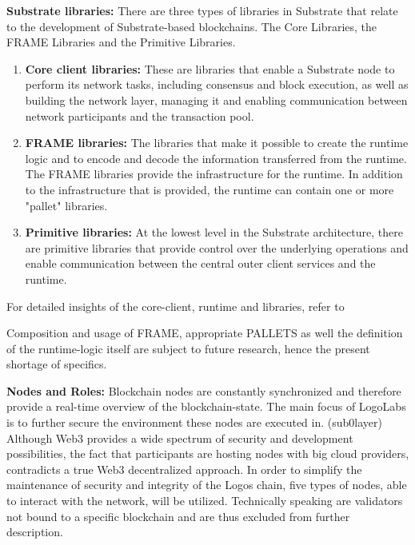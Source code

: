 \documentclass[]{article}
\begin{document}
\textbf{Substrate libraries:}
There are three types of libraries in Substrate that relate to the development of Substrate-based blockchains.
The Core Libraries, the FRAME Libraries and the Primitive Libraries.  

\begin{enumerate}[label=\textbullet]
	\item\textbf{Core client libraries:}
    These are libraries that enable a Substrate node to perform its network tasks, including consensus and block execution, as well as building the network layer, managing it and enabling communication between network participants and the transaction pool. 
	
	\item\textbf{FRAME libraries:} 
    The libraries that make it possible to create the runtime logic and to encode and decode the information transferred from the runtime.
    The FRAME libraries provide the infrastructure for the runtime.
    In addition to the infrastructure that is provided, the runtime can contain one or more "pallet" libraries.    
	
	\item\textbf{Primitive libraries:} 
	At the lowest level in the Substrate architecture, there are primitive libraries that provide control over the underlying operations and enable communication between the central outer client services and the runtime.	
\end{enumerate}
For detailed insights of the core-client, runtime and libraries, refer to \cite{SubstrateDoc-arch}

Composition and usage of FRAME, appropriate PALLETS as well the definition of the runtime-logic itself are subject to future research, hence the present shortage of specifics.
\newline

\textbf{Nodes and Roles:}
Blockchain nodes are constantly synchronized and therefore provide a real-time overview of the blockchain-state.
The main focus of LogoLabs is to further secure the environment these nodes are executed in. (sub0layer)
Although Web3 provides a wide spectrum of security and development possibilities, the fact that participants are hosting nodes with big cloud providers, contradicts a true Web3 decentralized approach. 
In order to simplify the maintenance of security and integrity of the Logos chain, five types of nodes, able to interact with the network, will be utilized. 
Technically speaking are validators \cite{PolkadotDoc-validator} not bound to a specific blockchain and are thus excluded from further description. 
\end{document}
